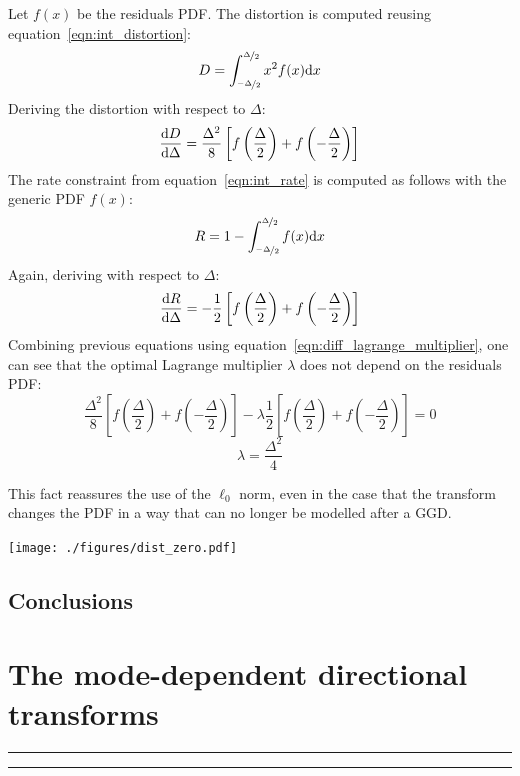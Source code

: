 \documentclass[11pt,a4paper,openright,twoside]{book}
\providecommand{\chaptertoc}{
	\startcontents[chapters]
	\hrule
	\vspace{1em}
	\printcontents[chapters]{}{1}{{\bf\large Contents}}
	\hrule
}
\numberwithin{equation}{section} %
\begin{document}
Let $f(x)$ be the residuals \ac{PDF}.
The distortion is computed reusing equation~\ref{eqn:int_distortion}:
\begin{equation}
	D = \int_{\nicefrac{-\Delta}{2}}^{\nicefrac{\Delta}{2}} x^2 f(x) \text{d} x
\end{equation}
Deriving the distortion with respect to $\Delta$:
\begin{equation}
	\frac{\text{d} D}{\text{d} \Delta} =
	\frac{\Delta^2}{8}\left[
	f\left(\frac{\Delta}{2}\right)+f\left(-\frac{\Delta}{2}\right)\right]
\end{equation}
The rate constraint from equation~\ref{eqn:int_rate} is computed as
follows with the generic \ac{PDF}
$f(x)$:
\begin{equation}
	R = 1 - \int_{\nicefrac{-\Delta}{2}}^{\nicefrac{\Delta}{2}} f(x) \text{d} x\\
\end{equation}
Again, deriving with respect to $\Delta$:
\begin{equation}
	\frac{\text{d} R}{\text{d} \Delta} =
	-\frac{1}{2}\left[
	f\left(\frac{\Delta}{2}\right)+
	f\left(-\frac{\Delta}{2}\right)\right]
\end{equation}
Combining previous equations using equation~\ref{eqn:diff_lagrange_multiplier},
one can see that the optimal Lagrange multiplier $\lambda$ does not
depend on the residuals \ac{PDF}:
\begin{equation}
	\frac{\Delta^2}{8}\left[
	f\left(\frac{\Delta}{2}\right)+f\left(-\frac{\Delta}{2}\right)\right]
	- \lambda
	\frac{1}{2}\left[
	f\left(\frac{\Delta}{2}\right)+
	f\left(-\frac{\Delta}{2}\right)\right] = 0
\end{equation}
\begin{equation}
	\boxed{\lambda = \frac{\Delta^2}{4}}
\end{equation}

This fact reassures the use of the $\ell_0$ norm, even in the case that
the transform changes the \ac{PDF} in a way that can no longer be modelled
after a \ac{GGD}.

% 
\texttt{[image: ./figures/dist\_zero.pdf]}

\section{Conclusions}
\label{sec:conclusions_transforms}

\chapter{The mode-dependent directional transforms}
\label{cha:the_mode_dependent_directional_transforms}
\chaptertoc
\end{document}
